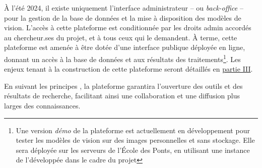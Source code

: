 À l'été 2024, il existe uniquement l'interface administrateur -- ou
\textit{back-office} -- pour la gestion de la base de données et la mise à
disposition des modèles de vision. L'accès à cette plateforme est
conditionnée par les droits admin accordés au chercheur.ses du projet, et à
tous ceux qui le demandent. À terme, cette plateforme est amenée à être
dotée d'une interface publique déployée en ligne, donnant un accès à la
base de données et aux résultats des traitements\footnote{Une version
  \emph{démo} de la plateforme est actuellement en développement pour
  tester les modèles de vision sur des images personnelles et sans
  stockage. Elle sera déployée sur les serveurs de l'École des Ponts, en
  utilisant une instance de l'\api développée dans le cadre du projet
  \eida}. Les enjeux tenant à la construction de cette plateforme seront
détaillés en \hyperlink{partie-III}{partie III}.

En suivant les principes \fair, la plateforme garantira l'ouverture des
outils et des résultats de recherche, facilitant ainsi une collaboration
et une diffusion plus larges des connaissances.